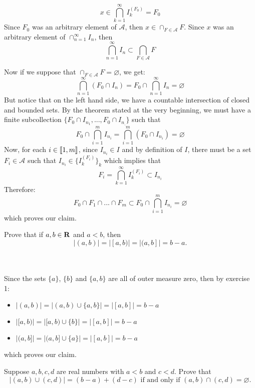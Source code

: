 \begin{solution}
\begin{itemize}
        $$x \in \bigcap_{k=1}^{\infty}I_k^{(F_0)} = F_0$$
        Since $F_0$ was an arbitrary element of $\mathcal{A}$, then $x \in \cap_{F \in \mathcal{A}}F$. Since $x$ was an arbitrary element of $\cap_{n=1}^{\infty}I_n$, then
        $$\bigcap_{n=1}^{\infty}I_n \subset \bigcap_{F\in\mathcal{A}}F$$
    \end{itemize}
    Now if we suppose that $ \cap_{F\in\mathcal{A}}F = \varnothing$, we get:
    $$\bigcap_{n=1}^{\infty}(F_0 \cap I_n) = F_0 \cap \bigcap_{n=1}^{\infty}I_n = \varnothing$$
    But notice that on the left hand side, we have a countable intersection of closed and bounded sets. By the theorem stated at the very beginning, we must have a finite subcollection $\{F_0 \cap I_{n_1}, ..., F_0 \cap I_{n_,}\}$ such that
    $$F_0 \cap \bigcap_{i=1}^m I_{n_i} = \bigcap_{i=1}^m (F_0 \cap I_{n_i}) = \varnothing$$
    Now, for each $i \in \llbracket 1 , m \rrbracket$, since $I_{n_i} \in I$ and by definition of $I$, there must be a set $F_i \in \mathcal{A}$ such that $I_{n_i} \in \{I_k^{(F_i)}\}_k$ which implies that
    $$F_i = \bigcap_{k=1}^{\infty}I_k^{(F_i)} \subset I_{n_i}$$
    Therefore:
    $$F_0 \cap F_1 \cap ... \cap F_m \subset F_0\cap \bigcap_{i=1}^m I_{n_i} = \varnothing$$
    which proves our claim. \\
\end{solution} 

\begin{exercise}
    Prove that if $a,b \in \mathbf{R}$ and $a < b$, then
    $$|(a,b)| = |[a,b)| = |(a,b]| = b-a.$$\\
\end{exercise}

\begin{solution}
    \\ Since the sets $\{a\}$, $\{b\}$ and $\{a,b\}$ are all of outer measure zero, then by exercise 1:
    \begin{itemize}
        \item $|(a,b)| = |(a,b) \cup \{a,b\}| = |[a,b]| = b-a$
        \item $|[a,b)| = |[a,b) \cup \{b\}| = |[a,b]| = b-a$
        \item $|(a,b]| = |(a,b] \cup \{a\}| = |[a,b]| = b-a$
    \end{itemize}
    which proves our claim.\\
\end{solution}

\begin{exercise}
    Suppose $a,b,c,d$ are real numbers with $a < b$ and $c < d$. Prove that
    $$|(a,b)\cup(c,d)| = (b-a) + (d-c) \text{ if and only if } (a,b)\cap(c,d) = \varnothing.$$ \\
\end{exercise}

